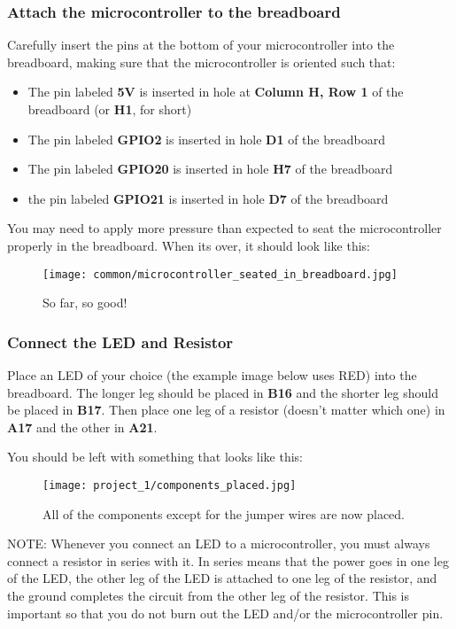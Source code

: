 \subsubsection{Attach the microcontroller to the breadboard}
Carefully insert the pins at the bottom of your microcontroller into the breadboard, making sure that the microcontroller is oriented such that:
\begin{itemize}
    \item The pin labeled \textbf{5V} is inserted in hole at \textbf{Column H, Row 1} of the breadboard (or \textbf{H1}, for short)
    \item The pin labeled \textbf{GPIO2} is inserted in hole \textbf{D1} of the breadboard
    \item The pin labeled \textbf{GPIO20} is inserted in hole \textbf{H7} of the breadboard
    \item the pin labeled \textbf{GPIO21} is inserted in hole \textbf{D7} of the breadboard
\end{itemize}
You may need to apply more pressure than expected to seat the microcontroller properly in the breadboard. When its over, it should look like this:

\begin{figure}[H]
    \centering
    \texttt{[image: common/microcontroller\_seated\_in\_breadboard.jpg]}
    \caption{So far, so good!}
\end{figure}

\subsubsection{Connect the LED and Resistor}
Place an LED of your choice (the example image below uses RED) into the breadboard. The longer leg
should be placed in \textbf{B16} and the shorter leg should be placed in \textbf{B17}. Then place one
leg of a resistor (doesn't matter which one) in \textbf{A17} and the other in \textbf{A21}.

You should be left with something that looks like this:
\begin{figure}[H]
    \centering
    \texttt{[image: project\_1/components\_placed.jpg]}
    \caption{All of the components except for the jumper wires are now placed.}
\end{figure}

\begin{tcolorbox}[colback=yellow!10!white,colframe=yellow!50!black]
    NOTE: Whenever you connect an LED to a microcontroller, you must always connect a resistor in series
    with it. In series means that the power goes in one leg of the LED, the other leg of the LED is attached
    to one leg of the resistor, and the ground completes the circuit from the other leg of the resistor.
    This is important so that you do not burn out the LED and/or the microcontroller pin.
\end{tcolorbox}

